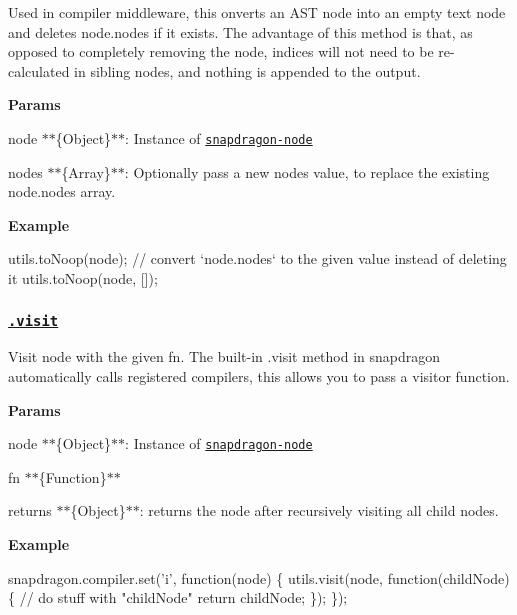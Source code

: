 Used in compiler middleware, this onverts an A\+ST node into an empty {\ttfamily text} node and deletes {\ttfamily node.\+nodes} if it exists. The advantage of this method is that, as opposed to completely removing the node, indices will not need to be re-\/calculated in sibling nodes, and nothing is appended to the output.

{\bfseries Params}


\begin{DoxyItemize}
\item {\ttfamily node} $\ast$$\ast$\{Object\}$\ast$$\ast$\+: Instance of \href{https://github.com/jonschlinkert/snapdragon-node}{\tt snapdragon-\/node}
\item {\ttfamily nodes} $\ast$$\ast$\{Array\}$\ast$$\ast$\+: Optionally pass a new {\ttfamily nodes} value, to replace the existing {\ttfamily node.\+nodes} array.
\end{DoxyItemize}

{\bfseries Example}


\begin{DoxyCode}
utils.toNoop(node);
// convert `node.nodes` to the given value instead of deleting it
utils.toNoop(node, []);
\end{DoxyCode}


\subsubsection*{\href{index.js#L128}{\tt .visit}}

Visit {\ttfamily node} with the given {\ttfamily fn}. The built-\/in {\ttfamily .visit} method in snapdragon automatically calls registered compilers, this allows you to pass a visitor function.

{\bfseries Params}


\begin{DoxyItemize}
\item {\ttfamily node} $\ast$$\ast$\{Object\}$\ast$$\ast$\+: Instance of \href{https://github.com/jonschlinkert/snapdragon-node}{\tt snapdragon-\/node}
\item {\ttfamily fn} $\ast$$\ast$\{Function\}$\ast$$\ast$
\item {\ttfamily returns} $\ast$$\ast$\{Object\}$\ast$$\ast$\+: returns the node after recursively visiting all child nodes.
\end{DoxyItemize}

{\bfseries Example}


\begin{DoxyCode}
snapdragon.compiler.set('i', function(node) \{
  utils.visit(node, function(childNode) \{
    // do stuff with "childNode"
    return childNode;
  \});
\});
\end{DoxyCode}



